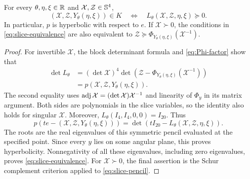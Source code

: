 \begin{lemma}\label{lem:slice}
For every $\theta,\eta,\xi\in\mathbb R$ and
$\mathcal X,\mathcal Z\in\mathbb S^4$,
\begin{equation}\label{eq:slice-equivalence}
 (\mathcal X,\mathcal Z,Y_\theta(\eta,\xi))\in K
 \quad\Longleftrightarrow\quad
 L_\theta(\mathcal X,\mathcal Z,\eta,\xi)\succeq0.
\end{equation}
In particular, $p$ is hyperbolic with respect to $e$. If
$\mathcal X\succ0$, the conditions in \eqref{eq:slice-equivalence}
are also equivalent to
$\mathcal Z\succeq\Phi_{Y_\theta(\eta,\xi)}(\mathcal X^{-1})$.
\end{lemma}

\begin{proof}
For invertible $\mathcal X$, the block determinant formula and
\eqref{eq:Phi-factor} show that
\begin{align*}
 \det L_\theta
 &= (\det\mathcal X)^4
    \det\!\left(\mathcal Z-
        \Phi_{Y_\theta(\eta,\xi)}(\mathcal X^{-1})\right)\\
 &=p(\mathcal X,\mathcal Z,Y_\theta(\eta,\xi)).
\end{align*}
The second equality uses
$\operatorname{adj}\mathcal X=(\det\mathcal X)\mathcal X^{-1}$ and linearity of
$\Phi_y$ in its matrix argument. Both sides are polynomials in the
slice variables, so the identity also holds for singular $\mathcal X$.
Moreover, $L_\theta(I_4,I_4,0,0)=I_{20}$. Thus
\begin{equation}\label{eq:roots}
 p\!\left(te-(\mathcal X,\mathcal Z,Y_\theta(\eta,\xi))\right)
 =\det\!\left(tI_{20}-L_\theta(\mathcal X,\mathcal Z,\eta,\xi)\right).
\end{equation}
The roots are the real eigenvalues of this symmetric pencil evaluated
at the specified point. Since every $y$ lies on some angular plane,
this proves hyperbolicity. Nonnegativity of all these eigenvalues,
including zero eigenvalues, proves \eqref{eq:slice-equivalence}.
For $\mathcal X\succ0$, the final assertion is the Schur complement
criterion applied to \eqref{eq:slice-pencil}.
\end{proof}
